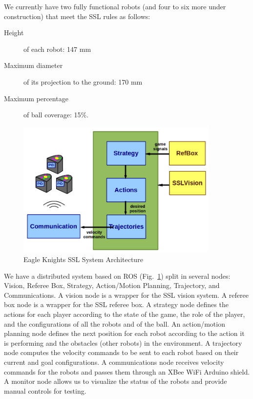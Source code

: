\documentclass[]{llncs}
\newcommand{\TODO}[1]{{\textcolor{blue}{ToDo: {#1}}}}
\begin{document}
We currently have two fully functional robots (and four to six more under construction) that meet the SSL rules as follows:
\begin{description} 
	\item [Height] of each robot: 147 mm
	\item [Maximum diameter] of its projection to the ground: 170 mm
	\item [Maximum percentage] of ball coverage: 15\%. 
\end{description}


\begin{figure}[htb]
	\centering
	\includegraphics[width=10cm]{./pictures/eagle_knights_architecture.png}
	\caption{Eagle Knights SSL System Architecture}
	\label{fig:eagle-knights-architecture}  
\end{figure}


We have a distributed system based on ROS (Fig.~\ref{fig:eagle-knights-architecture}) split in several nodes: Vision, Referee Box, Strategy, Action/Motion Planning, Trajectory, and Communications. A vision node is a wrapper for the SSL vision system. A referee box node is a wrapper for the SSL referee box. A strategy node defines the actions for each player  according to the state of the game, the role of the player, and the configurations of all the robots and of the ball. An action/motion planning node defines the next position for each robot according to the action it is performing and the obstacles (other robots) in the environment. A trajectory node computes the velocity commands to be sent to each robot based on their current and goal configurations. A communications node receives velocity commands for the robots and passes them through an XBee WiFi Arduino shield. A monitor node allows us to visualize the status of the robots and provide manual controls for testing.
\end{document}
